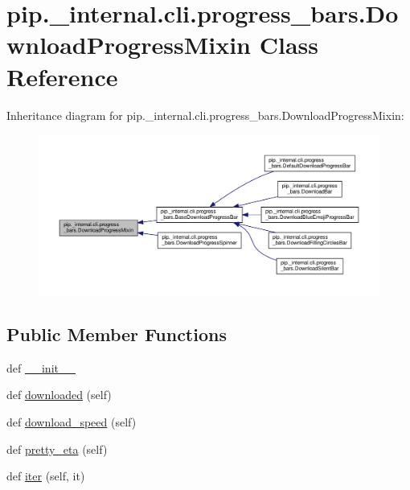 \hypertarget{classpip_1_1__internal_1_1cli_1_1progress__bars_1_1DownloadProgressMixin}{}\section{pip.\+\_\+internal.\+cli.\+progress\+\_\+bars.\+Download\+Progress\+Mixin Class Reference}
\label{classpip_1_1__internal_1_1cli_1_1progress__bars_1_1DownloadProgressMixin}


Inheritance diagram for pip.\+\_\+internal.\+cli.\+progress\+\_\+bars.\+Download\+Progress\+Mixin\+:
\nopagebreak
\begin{figure}[H]
\begin{center}
\leavevmode
\includegraphics[width=350pt]{classpip_1_1__internal_1_1cli_1_1progress__bars_1_1DownloadProgressMixin__inherit__graph}
\end{center}
\end{figure}
\subsection*{Public Member Functions}
\begin{DoxyCompactItemize}
\item 
def \hyperlink{classpip_1_1__internal_1_1cli_1_1progress__bars_1_1DownloadProgressMixin_a13666358df90610b40983cd716031429}{\+\_\+\+\_\+init\+\_\+\+\_\+}
\item 
def \hyperlink{classpip_1_1__internal_1_1cli_1_1progress__bars_1_1DownloadProgressMixin_a2451d440c7bcc7fe466fb6b299800e80}{downloaded} (self)
\item 
def \hyperlink{classpip_1_1__internal_1_1cli_1_1progress__bars_1_1DownloadProgressMixin_a6aeb6c6e1bc6f4a09a1f27a9ea559354}{download\+\_\+speed} (self)
\item 
def \hyperlink{classpip_1_1__internal_1_1cli_1_1progress__bars_1_1DownloadProgressMixin_a13cb4271a6e7c91edd65cc66c0326b36}{pretty\+\_\+eta} (self)
\item 
def \hyperlink{classpip_1_1__internal_1_1cli_1_1progress__bars_1_1DownloadProgressMixin_a37eab0ec657772189925ac4621198a88}{iter} (self, it)
\end{DoxyCompactItemize}
